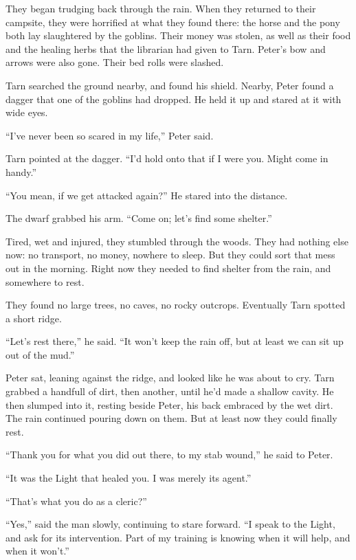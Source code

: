 
They began trudging back through the rain.
When they returned to their campsite, they were horrified at what they found there:  the horse and the pony both lay slaughtered by the goblins.  Their money was stolen, as well as their food and the healing herbs that the librarian had given to Tarn.  Peter's bow and arrows were also gone.  Their bed rolls were slashed.

Tarn searched the ground nearby, and found his shield.  Nearby, Peter found a dagger that one of the goblins had dropped.  He held it up and stared at it with wide eyes.

``I've never been so scared in my life,'' Peter said.

Tarn pointed at the dagger.  ``I'd hold onto that if I were you.  Might come in handy.''

``You mean, if we get attacked again?''  He stared into the distance.

The dwarf grabbed his arm.  ``Come on; let's find some shelter.''

Tired, wet and injured, they stumbled through the woods.  They had nothing else now: no transport, no money, nowhere to sleep.  But they could sort that mess out in the morning.  Right now they needed to find shelter from the rain, and somewhere to rest.

They found no large trees, no caves, no rocky outcrops.  Eventually Tarn spotted a short ridge.

``Let's rest there,'' he said.  ``It won't keep the rain off, but at least we can sit up out of the mud.''

Peter sat, leaning against the ridge, and looked like he was about to cry.  Tarn grabbed a handfull of dirt, then another, until he'd made a shallow cavity.  He then slumped into it, resting beside Peter, his back embraced by the wet dirt.  The rain continued pouring down on them.  But at least now they could finally rest.

``Thank you for what you did out there, to my stab wound,'' he said to Peter.

``It was the Light that healed you.  I was merely its agent.''

``That's what you do as a cleric?''

``Yes,'' said the man slowly, continuing to stare forward.  ``I speak to the Light, and ask for its intervention.  Part of my training is knowing when it will help, and when it won't.''

